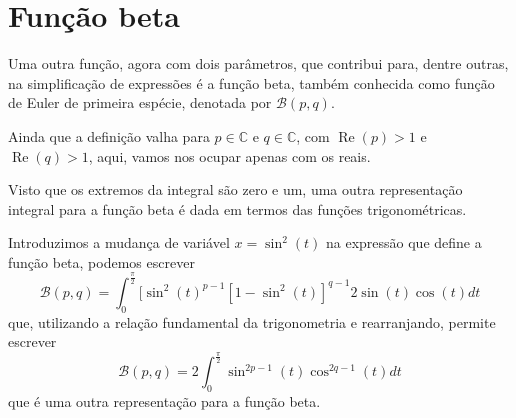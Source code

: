 



\section{Função beta}

Uma outra função, agora com dois parâmetros, que contribui para, dentre outras, na simplificação de expressões é a função beta, também conhecida como função de Euler de primeira espécie, denotada por $\mathcal{B}(p, q)$.



Ainda que a definição valha para $p \in \mathbb{C}$ e $q \in \mathbb{C}$, com $\operatorname{Re}(p) > 1$ e $\operatorname{Re}(q) > 1$, aqui, vamos nos ocupar
apenas com os reais.

Visto que os extremos da integral são zero e um, uma outra representação integral para a função beta é dada em termos das funções trigonométricas.

Introduzimos a mudança de variável $x = \sin^2(t)$ na expressão que define a função beta, podemos escrever
$$\mathcal{B}(p, q) = \int_{0}^{\frac{\pi}{2}} [\sin^2(t)^{p-1}[1 - \sin^2(t)]^{q-1} 2 \sin(t) \cos(t) dt$$
que, utilizando a relação fundamental da trigonometria e
rearranjando, permite escrever
$$\mathcal{B}(p, q) = 2 \int_{0}^{\frac{\pi}{2}} \sin^{2p-1}(t) \cos^{2q-1}(t) dt$$
que é uma outra representação para a função beta.





